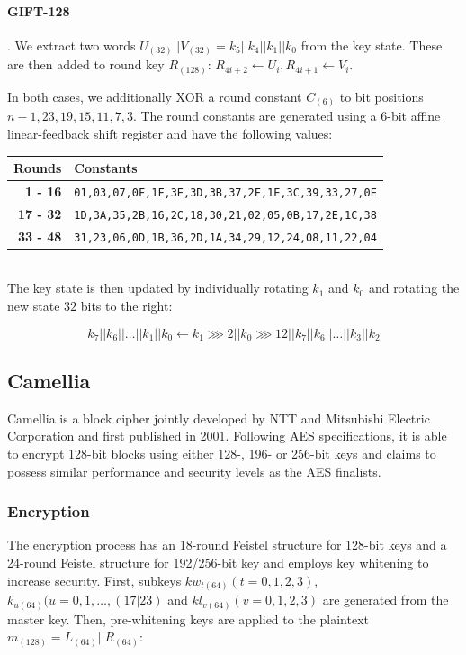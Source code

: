 \paragraph{GIFT-128}. We extract two words
$U_{(32)}||V_{(32)}=k_5||k_4||k_1||k_0$ from the key state. These are then
added to round key $R_{(128)}$: $R_{4i+2}\leftarrow U_i,R_{4i+1}\leftarrow
V_i$.

In both cases, we additionally XOR a round constant $C_{(6)}$ to bit positions
$n-1,23,19,15,11,7,3$. The round constants are generated using a 6-bit affine
linear-feedback shift register and have the following values:\\

\begin{tabular}{r|l}
    \textbf{Rounds} & \textbf{Constants} \\
    \hline
    \textbf{1 - 16} &  \small\texttt{01,03,07,0F,1F,3E,3D,3B,37,2F,1E,3C,39,33,27,0E} \\
    \textbf{17 - 32} & \small\texttt{1D,3A,35,2B,16,2C,18,30,21,02,05,0B,17,2E,1C,38} \\
    \textbf{33 - 48} & \small\texttt{31,23,06,0D,1B,36,2D,1A,34,29,12,24,08,11,22,04}
\end{tabular}\\

The key state is then updated by individually rotating $k_1$ and $k_0$ and
rotating the new state $32$ bits to the right:

\[
    k_7||k_6||\dots||k_1||k_0\leftarrow k_1\ggg 2||k_0\ggg 12||k_7||k_6||\dots||k_3||k_2
\]

\subsection{Camellia}

Camellia \cite{camellia:2001} is a block cipher jointly developed by NTT and
Mitsubishi Electric Corporation and first published in 2001. Following AES
specifications, it is able to encrypt 128-bit blocks using either 128-, 196- or
256-bit keys and claims to possess similar performance and security levels as
the AES finalists.

\subsubsection{Encryption}

The encryption process has an 18-round Feistel structure for 128-bit keys and a
24-round Feistel structure for 192/256-bit key and employs key whitening to
increase security. First, subkeys $kw_{t(64)}(t=0,1,2,3)$,
$k_{u(64)}(u=0,1,\dots,(17|23)$ and $kl_{v(64)}(v=0,1,2,3)$ are generated from
the master key. Then, pre-whitening keys are applied to the plaintext
$m_{(128)}=L_{(64)}||R_{(64)}$:

